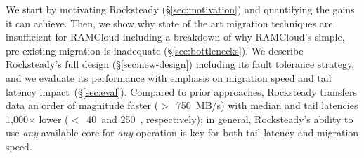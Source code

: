 We start by motivating Rocksteady (\S\ref{sec:motivation}) and quantifying the
gains it can achieve. Then, we show why state of the art migration techniques
are insufficient for RAMCloud including a breakdown of why RAMCloud's simple,
pre-existing migration is inadequate
(\S\ref{sec:bottlenecks}). We describe Rocksteady's full design
(\S\ref{sec:new-design}) including its fault tolerance strategy, and we evaluate
its performance with emphasis on migration speed and tail latency
impact~(\S\ref{sec:eval}).
Compared to prior approaches, Rocksteady transfers data an order of magnitude
faster ($>$~750~MB/s) with median and tail latencies 1,000$\times$ lower
($<$~40~\us and
250~\us, respectively); in general, Rocksteady's ability to use {\em any}
available core for {\em any} operation is key for both tail latency and
migration speed.
